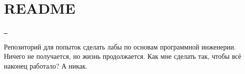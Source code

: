 \chapter{README}
\hypertarget{md__r_e_a_d_m_e}{}\label{md__r_e_a_d_m_e}
\href{https://github.com/Refareign/TestApp/actions/workflows/build.yml}{\texttt{ }}

Репозиторий для попыток сделать лабы по основам программной инженерии. Ничего не получается, но жизнь продолжается. Как мне сделать так, чтобы всё наконец работало? А никак. 